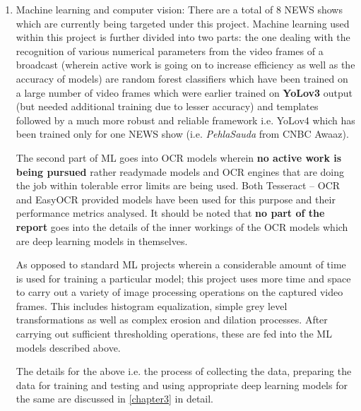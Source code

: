 \begin{enumerate}
  \item Machine learning and computer vision: There are a total of 8 NEWS shows which are currently being targeted under this project. Machine learning used within this project is further divided into two parts: the one dealing with the recognition of various numerical parameters from the video frames of a broadcast (wherein active work is going on to increase efficiency as well as the accuracy of models) are random forest classifiers which have been trained on a large number of video frames which were earlier trained on \textbf{YoLov3} output (but needed additional training due to lesser accuracy) and templates followed by a much more robust and reliable framework i.e. YoLov4 which has been trained only for one NEWS show (i.e. \textit{PehlaSauda} from CNBC Awaaz). \par

  The second part of ML goes into OCR models wherein \textbf{no active work is being pursued} rather readymade models and OCR engines that are doing the job within tolerable error limits are being used. Both Tesseract – OCR and EasyOCR provided models have been used for this purpose and their performance metrics analysed. It should be noted that \textbf{no part of the report} goes into the details of the inner workings of the OCR models which are deep learning models in themselves. \par

  As opposed to standard ML projects wherein a considerable amount of time is used for training a particular model; this project uses more time and space to carry out a variety of image processing operations on the captured video frames. This includes histogram equalization, simple grey level transformations as well as complex erosion and dilation processes. After carrying out sufficient thresholding operations, these are fed into the ML models described above.

  The details for the above i.e. the process of collecting the data, preparing the data for training and testing and using appropriate deep learning models for the same are discussed in \ref{chapter3} in detail.


\end{enumerate}
